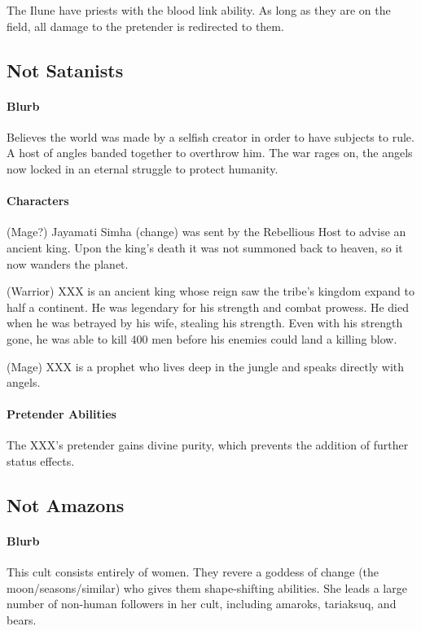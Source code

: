 \documentclass[12pt,letterpaper]{article}
\begin{document}
The Ilune have priests with the blood link ability.
As long as they are on the field,
all damage to the pretender is redirected to them.

\subsection{Not Satanists}
\paragraph{Blurb}

Believes the world was made by a selfish creator in order to have subjects to rule.
A host of angles banded together to overthrow him.
The war rages on, the angels now locked in an eternal struggle to protect humanity.

\paragraph{Characters}

(Mage?) Jayamati Simha (change) was sent
by the Rebellious Host to advise an ancient king.
Upon the king's death it was not summoned back to heaven,
so it now wanders the planet.

(Warrior) XXX is an ancient king whose reign saw
the tribe's kingdom expand to half a continent.
He was legendary for his strength and combat prowess.
He died when he was betrayed by his wife, stealing his strength.
Even with his strength gone,
he was able to kill 400 men before his enemies could land a killing blow.

(Mage) XXX is a prophet who lives deep in the jungle
and speaks directly with angels.

\paragraph{Pretender Abilities}

The XXX's pretender gains divine purity,
which prevents the addition of further status effects.

\subsection{Not Amazons}
\paragraph{Blurb}

This cult consists entirely of women.
They revere a goddess of change (the moon/seasons/similar)
who gives them shape-shifting abilities.
She leads a large number of non-human followers in her cult,
including amaroks, tariaksuq, and bears.
\end{document}
